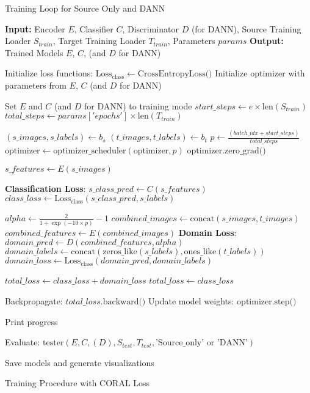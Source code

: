 \documentclass[conference]{IEEEtran}
\begin{document}
\begin{algorithm}
\caption{Training Loop for Source Only and DANN}
\label{alg:dann_training}
\begin{algorithmic}[1]
\scriptsize
\State \textbf{Input:} Encoder $E$, Classifier $C$, Discriminator $D$ (for DANN), Source Training Loader $S_{train}$, Target Training Loader $T_{train}$, Parameters $params$
\State \textbf{Output:} Trained Models $E$, $C$, (and $D$ for DANN)

\State Initialize loss functions: $\text{Loss}_\text{class} \gets \text{CrossEntropyLoss()}$
\State Initialize optimizer with parameters from $E$, $C$ (and $D$ for DANN)

    \State Set $E$ and $C$ (and $D$ for DANN) to training mode
    \State $start\_steps \gets e \times \text{len}(S_{train})$
    \State $total\_steps \gets params['epochs'] \times \text{len}(T_{train})$

        \State $(s\_images, s\_labels) \gets b_s$
        \State $(t\_images, t\_labels) \gets b_t$
        \State $p \gets \frac{(batch\_idx + start\_steps)}{total\_steps}$
        \State $\text{optimizer} \gets \text{optimizer\_scheduler}(\text{optimizer}, p)$
        \State $\text{optimizer.zero\_grad()}$

        \State $s\_features \gets E(s\_images)$

        \State \textbf{Classification Loss}:
        \State $s\_class\_pred \gets C(s\_features)$
        \State $class\_loss \gets \text{Loss}_\text{class}(s\_class\_pred, s\_labels)$

            \State $alpha \gets \frac{2}{1 + \exp(-10 \times p)} - 1$
            \State $combined\_images \gets \text{concat}(s\_images, t\_images)$
            \State $combined\_features \gets E(combined\_images)$
            \State \textbf{Domain Loss}:
            \State $domain\_pred \gets D(combined\_features, alpha)$
            \State $domain\_labels \gets \text{concat}(\text{zeros\_like}(s\_labels), \text{ones\_like}(t\_labels))$
            \State $domain\_loss \gets \text{Loss}_\text{class}(domain\_pred, domain\_labels)$

            \State $total\_loss \gets class\_loss + domain\_loss$
        \Else
            \State $total\_loss \gets class\_loss$
        \EndIf

        \State Backpropagate: $total\_loss.\text{backward()}$
        \State Update model weights: $\text{optimizer.step()}$

            \State Print progress
        \EndIf
    \EndFor

    \State Evaluate: $\text{tester}(E, C, (D), S_{test}, T_{test}, \text{'Source\_only'} \text{ or } \text{'DANN'})$
\EndFor

\State Save models and generate visualizations

\end{algorithmic}
\end{algorithm}
\caption{Training Procedure with CORAL Loss}
\end{document}
